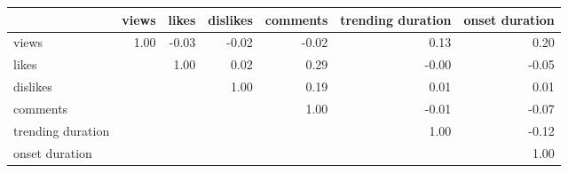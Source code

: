\begin{tabular}{lrrrrrr}
\toprule
{} &  views &  likes &  dislikes &  comments &  trending duration &  onset duration \\
\midrule
views             &   1.00 &  -0.03 &     -0.02 &     -0.02 &               0.13 &            0.20 \\
likes             &        &   1.00 &      0.02 &      0.29 &              -0.00 &           -0.05 \\
dislikes          &        &        &      1.00 &      0.19 &               0.01 &            0.01 \\
comments          &        &        &           &      1.00 &              -0.01 &           -0.07 \\
trending duration &        &        &           &           &               1.00 &           -0.12 \\
onset duration    &        &        &           &           &                    &            1.00 \\
\bottomrule
\end{tabular}
